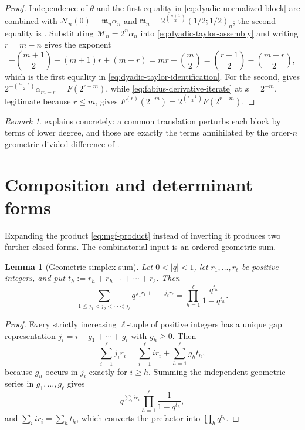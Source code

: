 \documentclass[11pt,oneside,openany]{book}
\newtheorem{lemma}[lemma]{Lemma}
\theoremstyle{definition}
\theoremstyle{remark}
\newtheorem{remark}[remark]{Remark}
\newcommand{\abs}[1]{\lvert #1\rvert}
\begin{document}
\begin{proof}
Independence of $\theta$ and the first equality in \eqref{eq:dyadic-normalized-block}
are  combined with
$\mathcal N_n(0)=\mathfrak m_n\alpha_n$ and
$\mathfrak m_n=2^{\binom{n+1}{2}}(1/2;1/2)_n$; the second equality is
.  Substituting
$\mathcal M_n=2^n\alpha_n$ into \eqref{eq:dyadic-taylor-assembly} and writing $r=m-n$
gives the exponent
\[
 -\binom{m+1}{2}+(m+1)r+(m-r)=mr-\binom m2
 =\binom{r+1}{2}-\binom{m-r}{2},
\]
which is the first equality in \eqref{eq:dyadic-taylor-identification}.  For the second,
 gives
$2^{-\binom{m-r}{2}}\alpha_{m-r}=F(2^{r-m})$, while
\eqref{eq:fabius-derivative-iterate} at $x=2^{-m}$, legitimate because $r\le m$, gives
$F^{(r)}(2^{-m})=2^{\binom{r+1}{2}}F(2^{r-m})$.
\end{proof}

\begin{remark}
 explains  concretely: a
common translation perturbs each block by terms of lower degree, and those are exactly
the terms annihilated by the order-$n$ geometric divided difference of
.
\end{remark}

\section{Composition and determinant forms}

Expanding the product \eqref{eq:mgf-product} instead of inverting it produces two
further closed forms.  The combinatorial input is an ordered geometric sum.

\begin{lemma}[Geometric simplex sum]\label{lem:geometric-simplex}
Let $0<\abs q<1$, let $r_1,\ldots,r_\ell$ be positive integers, and put
$t_h:=r_h+r_{h+1}+\cdots+r_\ell$.  Then
\begin{equation}\label{eq:geometric-simplex}
 \sum_{1\le j_1<j_2<\cdots<j_\ell}
 q^{\,j_1r_1+\cdots+j_\ell r_\ell}
 =\prod_{h=1}^{\ell}\frac{q^{t_h}}{1-q^{t_h}} .
\end{equation}
\end{lemma}

\begin{proof}
Every strictly increasing $\ell$-tuple of positive integers has a unique gap
representation $j_i=i+g_1+\cdots+g_i$ with $g_h\ge0$.  Then
\[
 \sum_{i=1}^{\ell}j_ir_i
 =\sum_{i=1}^{\ell}ir_i+\sum_{h=1}^{\ell}g_ht_h,
\]
because $g_h$ occurs in $j_i$ exactly for $i\ge h$.  Summing the independent geometric
series in $g_1,\ldots,g_\ell$ gives
\[
 q^{\sum_iir_i}\prod_{h=1}^{\ell}\frac1{1-q^{t_h}},
\]
and $\sum_iir_i=\sum_ht_h$, which converts the prefactor into $\prod_hq^{t_h}$.
\end{proof}
\end{document}
